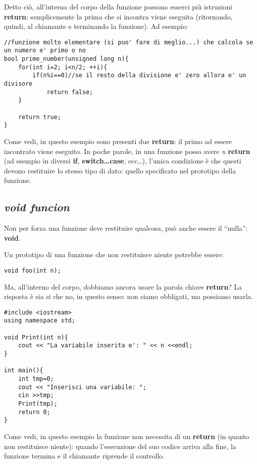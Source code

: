 Detto ciò, all'interno del corpo della funzione possono esserci più istruzioni \textbf{return}: semplicemente la prima che si incontra viene eseguita (ritornando, quindi, al chiamante e terminando la funzione). Ad esempio:
\begin{lstlisting}
//funzione molto elementare (si puo' fare di meglio...) che calcola se un numero e' primo o no
bool prime_number(unsigned long n){ 
	for(int i=2; i<n/2; ++i){
		if(n%i==0)//se il resto della divisione e' zero allora e' un divisore
			return false;  
	}

	return true;
}
\end{lstlisting}

Come vedi, in questo esempio sono presenti due \textbf{return}: il primo ad essere incontrato viene eseguito. In poche parole, in una funzione posso avere \emph{n} \textbf{return} (ad esempio in diversi \textbf{if}, \textbf{switch\ldots case}, ecc\ldots), l'unica condizione è che questi devono restituire lo stesso tipo di dato: quello specificato nel prototipo della funzione.

\subsection{\emph{void funcion}}
Non per forza una funzione deve restituire qualcosa, può anche essere il ``nulla'': \textbf{void}. 

Un prototipo di una funzione che non restituisce niente potrebbe essere:
\begin{lstlisting}
void foo(int n);
\end{lstlisting}

Ma, all'interno del corpo, dobbiamo ancora usare la parola chiave \textbf{return}? La risposta è sia si che no, in questo senso: non siamo obbligati, ma possiamo usarla. 

\begin{lstlisting}
#include <iostream>
using namespace std;

void Print(int n){
	cout << "La variabile inserita e': " << n <<endl;
}

int main(){
	int tmp=0;
	cout << "Inserisci una variabile: ";
	cin >>tmp;
	Print(tmp);
	return 0;
}
\end{lstlisting}

Come vedi, in questo esempio la funzione non necessita di un \textbf{return} (in quanto non restituisce niente): quando l'esecuzione del suo codice arriva alla fine, la funzione termina e il chiamante riprende il controllo.

